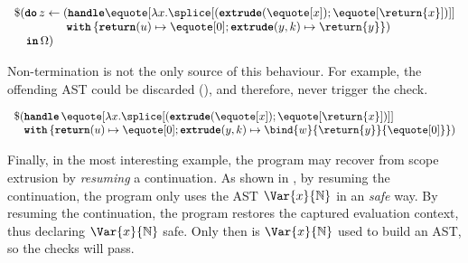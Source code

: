 \begin{code} 
 \begin{source}
  $\begin{array}{l}
      \$(\textbf{\texttt{do}} \, z \leftarrow (\textbf{\texttt{handle}} \equote[{\lambda x. \splice[({{\textbf{\texttt{extrude}}(\equote[x])}; \equote[\return{x}]})]}] \\
      \quad\quad\quad\quad\,\; \textbf{\texttt{with}} \, \{ \textbf{\texttt{return}}(u) \mapsto {\equote[0]}; \textbf{\texttt{extrude}}(y, k) \mapsto {\return{y}}\})\\
      \quad \textbf{\texttt{in}} \, \Omega)
    \end{array}$
 \end{source}
 \label{listing:eager-scope-extrusion-unsafe}
\end{code}


Non-termination is not the only source of this behaviour. For example, the offending AST could be discarded (), and therefore, never trigger the check.

\begin{code} 
 \begin{source}
  $\begin{array}{l}
      \$(\textbf{\texttt{handle}} \, \equote[{\lambda x. \splice[({{\textbf{\texttt{extrude}}(\equote[x])}; \equote[\return{x}]})]}] \\
      \;\;\,\, \textbf{\texttt{with}} \, \{ \textbf{\texttt{return}}(u) \mapsto {\equote[0]}; \textbf{\texttt{extrude}}(y, k) \mapsto {\bind{w}{\return{y}}{\equote[0]}}\})
    \end{array}$
 \end{source}
 \label{listing:eager-scope-extrusion-unsafe-no-use}
\end{code}

Finally, in the most interesting example, the program may recover from scope extrusion by \textit{resuming} a continuation. As shown in , by resuming the continuation, the program only uses the AST $\Var{x}{\mathbb{N}}$ in an \textit{safe} way. By resuming the continuation, the program restores the captured evaluation context, thus declaring $\Var{x}{\mathbb{N}}$ safe. Only then is $\Var{x}{\mathbb{N}}$ used to build an AST, so the checks will pass.

